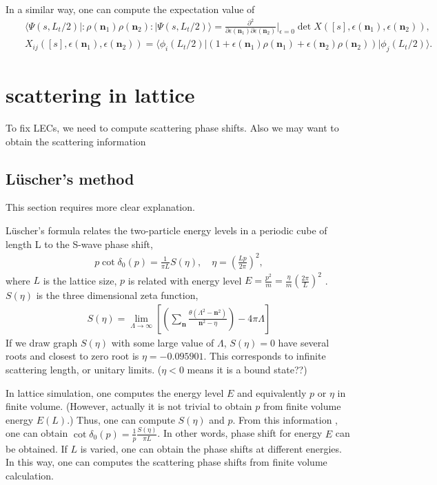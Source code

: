 \documentclass[10pt]{book}
\def\bm{\boldsymbol}
\newcommand{\bea}{\begin{eqnarray}}
\newcommand{\eea}{\end{eqnarray}}
\newcommand{\no}{\nonumber \\}
\newcommand{\del}{\partial}
\def\vn{{\bm n}}
\def\la{\langle}
\def\ra{\rangle}
\begin{document}
In a similar way, one can compute the expectation value of 
\bea 
& &\la \Psi(s,L_t/2)|: \rho(\vn_1)\rho(\vn_2): |\Psi(s,L_t/2)\ra 
=\frac{\del^2}{\del \epsilon(\vn_1)\del \epsilon(\vn_2)}|_{\epsilon=0} \det X([s],\epsilon(\vn_1),\epsilon(\vn_2)) ,\no 
& &X_{ij} ([s],\epsilon(\vn_1),\epsilon(\vn_2)) =\la \phi_i (L_t/2)|(1+\epsilon(\vn_1)\rho(\vn_1)+\epsilon(\vn_2)\rho(\vn_2))|\phi_j(L_t/2)\ra. 
\eea 


\chapter{scattering in lattice}
To fix LECs, we need to compute scattering phase shifts.
Also we may want to obtain the scattering information 

\section{L\"{u}scher's method} 
{\color{red} This section requires more clear explanation.}

 
L\"{u}scher's formula relates the two-particle energy levels in a periodic cube of length 
L to the S-wave phase shift,
\bea 
p\cot\delta_0(p)=\frac{1}{\pi L} S(\eta),\quad \eta=(\frac{Lp}{2\pi})^2, 
\eea  
where $L$ is the lattice size, $p$ is related with energy level
 $E=\frac{p^2}{m}=\frac{\eta}{m}(\frac{2\pi}{L})^2$ .
 $S(\eta)$ is the three dimensional zeta function, 
 \bea 
 S(\eta)=\lim_{\Lambda\to\infty}\left[ 
    \left( \sum_{\vn}\frac{\theta(\Lambda^2-\vn^2)}{\vn^2-\eta} \right) 
   -4\pi\Lambda \right]  
 \eea  
If we draw graph $S(\eta)$ with some large value of $\Lambda$, $S(\eta)=0$ have 
several roots and closest to zero root is $\eta=-0.095901$. 
This corresponds to infinite scattering length, or unitary limits. 
($\eta<0$ means it is a bound state??)

In lattice simulation, one computes the energy level $E$ and equivalently $p$ or $\eta$ in finite volume. 
(However, actually it is not trivial to obtain $p$ from finite volume energy $E(L)$.)
Thus, one can compute $S(\eta)$ and $p$. From this information , one can obtain 
$\cot\delta_0(p)=\frac{1}{p} \frac{S(\eta)}{\pi L}$. In other words, phase shift for energy $E$
can be obtained. If $L$ is varied, one can obtain the phase shifts at different energies. 
In this way, one can computes the scattering phase shifts from finite volume calculation. 
\end{document}
